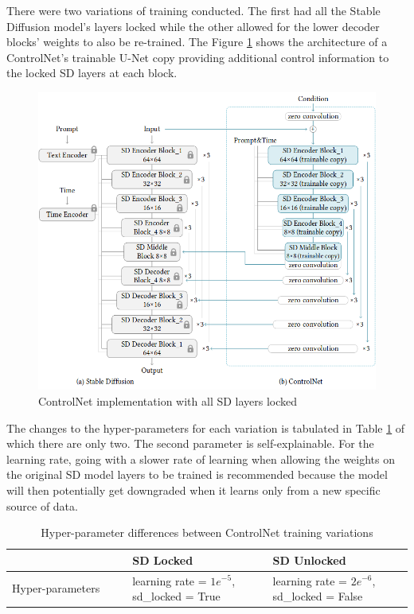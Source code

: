 There were two variations of training conducted. The first had all the Stable Diffusion model's layers locked while the other allowed for the lower decoder blocks' weights to also be re-trained. The Figure \ref{fig:controlnet-sd-locked} 
shows the architecture of a ControlNet's trainable U-Net copy providing additional control information to the locked SD layers at each block. 
\begin{figure}[ht]
    \centering
    \includegraphics[width=1\linewidth]{4_ResearchMethodology/figures/training_sd_locked.png}
    \caption[ControlNet architecture]{ControlNet implementation with all SD layers locked \parencite[Figure 3, p. 4 ]{Zhang2023AddingModels}}
    \label{fig:controlnet-sd-locked}
\end{figure}
The changes to the hyper-parameters for each variation is tabulated in Table \ref{tab:training-variation} of which there are only two. The second parameter is self-explainable. For the learning rate, going with a slower rate of learning when allowing the weights on the original SD model layers to be trained is recommended because the model will then potentially get downgraded when it learns only from a new specific source of data.

\begin{table}[H]
\begin{center}
\begin{tabular}{|>{\raggedright\arraybackslash}p{0.3\linewidth}|>{\raggedright\arraybackslash}p{0.35\linewidth}|>{\raggedright\arraybackslash}p{0.35\linewidth}|}
\hline 
\textbf{}& \textbf{SD Locked}& \textbf{SD Unlocked}\\ \hline 
Hyper-parameters& learning rate = $1e^{-5}$, sd\_locked = True& learning rate = $2e^{-6}$, sd\_locked = False\\ \hline
\end{tabular}
\caption[Hyper-parameter differences between ControlNet training variations]{Hyper-parameter differences between ControlNet training variations}\label{tab:training-variation}
\end{center}
\end{table}

